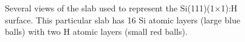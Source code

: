 \begin{figure}[H]
\centering
{}\hfill
{}\hfill
{}
\caption{Several views of the slab used to represent the Si(111)(1$\times$1):H
surface. This particular slab has 16 Si atomic layers (large blue balls) with
two H atomic layers (small red balls).}
\label{fig:1x1struc}
\end{figure}

